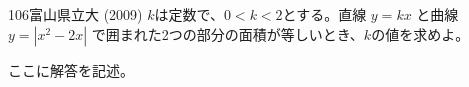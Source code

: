 \begin{prob}{106}{\maru}{富山県立大 (2009)}
 $k$は定数で、$0<k<2$とする。直線 $y=kx$ と曲線 $y=\left|x^2-2x\right|$ で囲まれた2つの部分の面積が等しいとき、$k$の値を求めよ。
\end{prob}
ここに解答を記述。